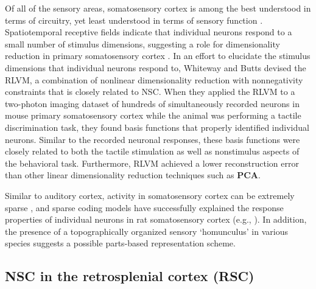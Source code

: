 Of all of the sensory areas,
somatosensory cortex is among the best understood in terms of circuitry,
yet least understood in terms of sensory function
\cite{Ramirez2014}.
Spatiotemporal receptive fields indicate that individual neurons respond to a small number of stimulus dimensions, suggesting a role for dimensionality reduction in primary somatosensory cortex \cite{Ramirez2014}.
In an effort to elucidate the stimulus dimensions that individual neurons respond to,
Whiteway and Butts \cite{WhitewayButts2017} devised the \ac{RLVM},
a combination of nonlinear dimensionality reduction with nonnegativity constraints
that is closely related to \ac{NSC}.
When they applied the \ac{RLVM} to 
a two-photon imaging dataset of hundreds of simultaneously recorded neurons 
in mouse primary somatosensory cortex while the animal was performing
a tactile discrimination task,
they found basis functions that properly identified individual neurons.
Similar to the recorded neuronal responses, these basis functions were closely related
to both the tactile stimulation as well as 
nonstimulus aspects of the behavioral task.
Furthermore, \ac{RLVM} achieved a lower reconstruction error than other
linear dimensionality reduction techniques such as \textbf{\ac{PCA}}.

Similar to auditory cortex,
activity in somatosensory cortex can be extremely sparse
\cite{Jadhav2009,oconnor2010,Crochet2011},
and sparse coding models have successfully explained the response properties
of individual neurons in rat somatosensory cortex (e.g., \cite{Hafner2004}).
In addition, the presence of a topographically organized sensory `homunculus' 
in various species \cite{penfield1937,hari1993,petersen2007} 
suggests a possible parts-based representation scheme.


\subsection*{NSC in the retrosplenial cortex (RSC)}

